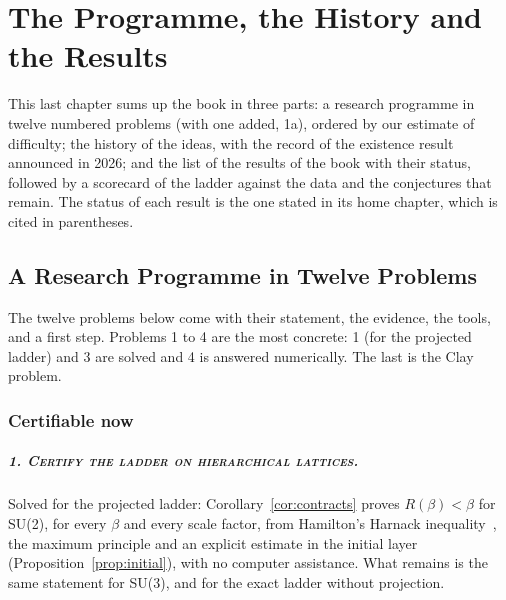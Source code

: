 \chapter{The Programme, the History and the Results}\label{ch:programme}

This last chapter sums up the book in three parts: a research programme in twelve numbered problems (with one added, 1a), ordered by our estimate of difficulty; the history of the ideas, with the record of the existence result announced in 2026; and the list of the results of the book with their status, followed by a scorecard of the ladder against the data and the conjectures that remain. The status of each result is the one stated in its home chapter, which is cited in parentheses.

\section{A Research Programme in Twelve Problems}\label{sec:programme}

The twelve problems below come with their statement, the evidence, the tools, and a first step. Problems 1 to 4 are the most concrete: 1 (for the projected ladder) and 3 are solved and 4 is answered numerically. The last is the Clay problem.

\subsection{Certifiable now}

\paragraph{\normalfont\scshape 1. Certify the ladder on hierarchical lattices.} Solved for the projected ladder: Corollary~\ref{cor:contracts} proves $R(\beta)<\beta$ for SU(2), for every $\beta$ and every scale factor, from Hamilton's Harnack inequality~\cite{Ha93}, the maximum principle and an explicit estimate in the initial layer (Proposition~\ref{prop:initial}), with no computer assistance. What remains is the same statement for SU(3), and for the exact ladder without projection.

